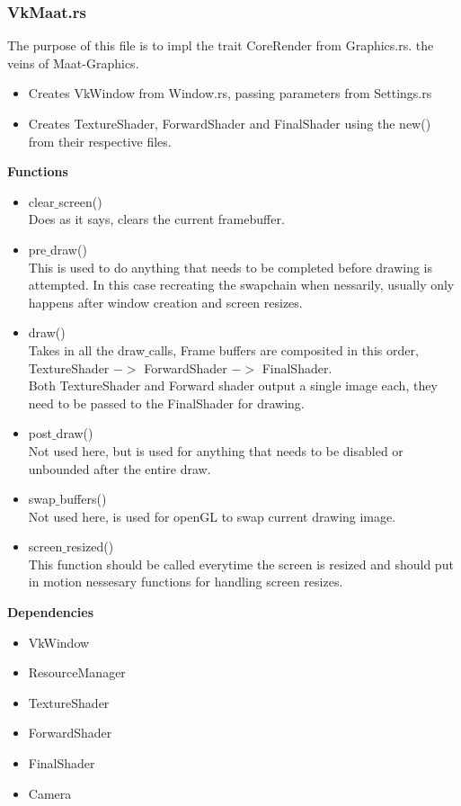 \documentclass[12pt,a4paper]{article}
\begin{document}
\subsubsection{VkMaat.rs}
The purpose of this file is to impl the trait CoreRender from Graphics.rs. the veins of Maat-Graphics.\\
\begin{itemize}
\item Creates VkWindow from Window.rs, passing parameters from Settings.rs
\item Creates TextureShader, ForwardShader and FinalShader using the new() from their respective files.
\end{itemize}
\textbf{Functions}
\begin{itemize}
\item clear$\_$screen() \\Does as it says, clears the current framebuffer.
\item pre$\_$draw() \\This is used to do anything that needs to be completed before drawing is attempted. In this case recreating the swapchain when nessarily, usually only happens after window creation and screen resizes.
\item draw() \\Takes in all the draw$\_$calls, Frame buffers are composited in this order, TextureShader $->$ ForwardShader $->$ FinalShader. \\Both TextureShader and Forward shader output a single image each, they need to be passed to the FinalShader for drawing.
\item post$\_$draw() \\Not used here, but is used for anything that needs to be disabled or unbounded after the entire draw.
\item swap$\_$buffers()\\Not used here, is used for openGL to swap current drawing image.
\item screen$\_$resized()\\This function should be called everytime the screen is resized and should put in motion nessesary functions for handling screen resizes.
\end{itemize}
\textbf{Dependencies}
\begin{itemize}
\item VkWindow
\item ResourceManager
\item TextureShader
\item ForwardShader
\item FinalShader
\item Camera
\end{itemize}
\end{document}
